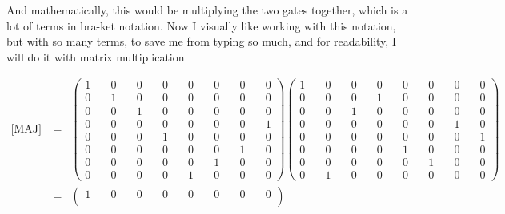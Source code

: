 \documentclass[preprint,aps,prd,nofootinbib,superscriptaddress]{revtex4-2}
\begin{document}
And mathematically, this would be multiplying the two gates together, which is a lot of terms in bra-ket notation. Now I visually like working with this notation, but with so many terms, to save me from typing so much, and for readability, I will do it with matrix multiplication

\begin{eqnarray}
\text{[MAJ][UMA]} &=& 
\begin{pmatrix}
1 \quad & 0 \quad & 0 \quad & 0 \quad & 0 \quad & 0 \quad & 0 \quad & 0 \\
0 \quad & 1 \quad & 0 \quad & 0 \quad & 0 \quad & 0 \quad & 0 \quad & 0 \\
0 \quad & 0 \quad & 1 \quad & 0 \quad & 0 \quad & 0 \quad & 0 \quad & 0 \\
0 \quad & 0 \quad & 0 \quad & 0 \quad & 0 \quad & 0 \quad & 0 \quad & 1 \\
0 \quad & 0 \quad & 0 \quad & 1 \quad & 0 \quad & 0 \quad & 0 \quad & 0 \\
0 \quad & 0 \quad & 0 \quad & 0 \quad & 0 \quad & 0 \quad & 1 \quad & 0 \\
0 \quad & 0 \quad & 0 \quad & 0 \quad & 0 \quad & 1 \quad & 0 \quad & 0 \\
0 \quad & 0 \quad & 0 \quad & 0 \quad & 1 \quad & 0 \quad & 0 \quad & 0
\end{pmatrix}
\begin{pmatrix}
1 \quad & 0 \quad & 0 \quad & 0 \quad & 0 \quad & 0 \quad & 0 \quad & 0 \\
0 \quad & 0 \quad & 0 \quad & 1 \quad & 0 \quad & 0 \quad & 0 \quad & 0 \\
0 \quad & 0 \quad & 1 \quad & 0 \quad & 0 \quad & 0 \quad & 0 \quad & 0 \\
0 \quad & 0 \quad & 0 \quad & 0 \quad & 0 \quad & 0 \quad & 1 \quad & 0 \\
0 \quad & 0 \quad & 0 \quad & 0 \quad & 0 \quad & 0 \quad & 0 \quad & 1 \\
0 \quad & 0 \quad & 0 \quad & 0 \quad & 1 \quad & 0 \quad & 0 \quad & 0 \\
0 \quad & 0 \quad & 0 \quad & 0 \quad & 0 \quad & 1 \quad & 0 \quad & 0 \\
0 \quad & 1 \quad & 0 \quad & 0 \quad & 0 \quad & 0 \quad & 0 \quad & 0
\end{pmatrix}
\nonumber \\
&=& 
\begin{pmatrix}
1 \quad & 0 \quad & 0 \quad & 0 \quad & 0 \quad & 0 \quad & 0 \quad & 0 \\

\end{pmatrix}
\end{eqnarray}
\end{document}
